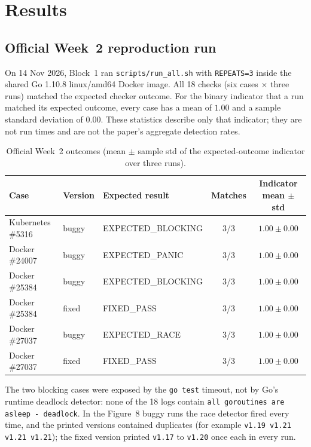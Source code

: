 \section{Results}
\label{sec:results}

\subsection{Official Week~2 reproduction run}
On 14 Nov 2026, Block~1 ran \texttt{scripts/run\_all.sh} with \texttt{REPEATS=3}
inside the shared Go 1.10.8 linux/amd64 Docker image. All 18 checks (six cases
$\times$ three runs) matched the expected checker outcome. For the binary
indicator that a run matched its expected outcome, every case has a mean of
$1.00$ and a sample standard deviation of $0.00$. These statistics describe
only that indicator; they are not run times and are not the paper's aggregate
detection rates.

\begin{table}[H]
  \centering
  \caption{Official Week~2 outcomes (mean $\pm$ sample std of the
    expected-outcome indicator over three runs).}
  \label{tab:week2-outcomes}
  \small
  \setlength{\tabcolsep}{5pt}
  \begin{tabularx}{\linewidth}{L{3.2cm}L{1.4cm}Ycc}
    \toprule
    Case & Version & Expected result & Matches & Indicator mean $\pm$ std \\
    \midrule
    Kubernetes \#5316 & buggy & EXPECTED\_BLOCKING & 3/3 & $1.00 \pm 0.00$ \\
    Docker \#24007    & buggy & EXPECTED\_PANIC    & 3/3 & $1.00 \pm 0.00$ \\
    Docker \#25384    & buggy & EXPECTED\_BLOCKING & 3/3 & $1.00 \pm 0.00$ \\
    Docker \#25384    & fixed & FIXED\_PASS        & 3/3 & $1.00 \pm 0.00$ \\
    Docker \#27037    & buggy & EXPECTED\_RACE     & 3/3 & $1.00 \pm 0.00$ \\
    Docker \#27037    & fixed & FIXED\_PASS        & 3/3 & $1.00 \pm 0.00$ \\
    \bottomrule
  \end{tabularx}
\end{table}

The two blocking cases were exposed by the \texttt{go test} timeout, not by
Go's runtime deadlock detector: none of the 18 logs contain
\texttt{all goroutines are asleep - deadlock}. In the Figure~8 buggy runs the
race detector fired every time, and the printed versions contained duplicates
(for example \texttt{v1.19 v1.21 v1.21 v1.21}); the fixed version printed
\texttt{v1.17} to \texttt{v1.20} once each in every run.

